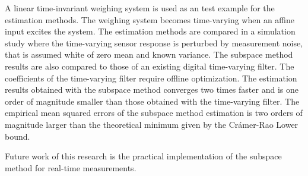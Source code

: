 A linear time-invariant weighing system is used as an test example for the estimation methods.
The weighing system becomes time-varying when an affine input excites the system.
The estimation methods are compared in a simulation study where the time-varying sensor response is perturbed by measurement noise, that is assumed white of zero mean and known variance.
The subspace method results are also compared to those of an existing digital time-varying filter.
The coefficients of the time-varying filter require offline optimization.
The estimation results obtained with the subspace method converges two times faster and is one order of magnitude smaller than those obtained with the time-varying filter.
The empirical mean squared errors of the subspace method estimation is two orders of magnitude larger than the theoretical minimum given by the Cr\'amer-Rao Lower bound.

Future work of this research is the practical implementation of the subspace method for real-time measurements.

\newpage
